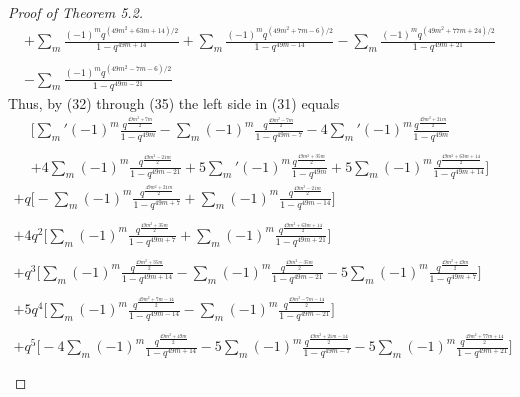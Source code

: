 \documentclass[10pt,reqno]{amsart}
\begin{document}
\begin{proof}[Proof of Theorem 5.2]
\begin{multline}
    +\displaystyle\sum_{m}\displaystyle\frac{(-1)^mq^{(49m^2+63m+14)/2}}{1-q^{49m+14}}+\displaystyle\sum_{m}\displaystyle\frac{(-1)^mq^{(49m^2+7m-6)/2}}{1-q^{49m-14}}-\displaystyle\sum_{m}\displaystyle\frac{(-1)^mq^{(49m^2+77m+24)/2}}{1-q^{49m+21}}\\ \\
    -\displaystyle\sum_{m}\displaystyle\frac{(-1)^mq^{(49m^2-7m-6)/2}}{1-q^{49m-21}}
\end{multline}
Thus, by (32) through (35) the left side in (31) equals 
\begin{multline*}
    \Bigg[\displaystyle\sum_{m}'(-1)^m\displaystyle\frac{q^{\frac{49m^2+7m}{2}}}{1-q^{49m}}-\displaystyle\sum_{m}(-1)^m\displaystyle\frac{q^{\frac{49m^2-7m}{2}}}{1-q^{49m-7}}-4\displaystyle\sum_{m}'(-1)^m\displaystyle\frac{q^{\frac{49m^2+21m}{2}}}{1-q^{49m}}\\ \\
    +4\displaystyle\sum_{m}(-1)^m\displaystyle\frac{q^{\frac{49m^2-21m}{2}}}{1-q^{49m-21}}+5\displaystyle\sum_{m}'(-1)^m\displaystyle\frac{q^{\frac{49m^2+35m}{2}}}{1-q^{49m}}+5\displaystyle\sum_{m}(-1)^m\displaystyle\frac{q^{\frac{49m^2+63m+14}{2}}}{1-q^{49m+14}}\Bigg] 
\end{multline*} 
\begin{multline}
    +q\Bigg[-\displaystyle\sum_{m}(-1)^m\displaystyle\frac{q^{\frac{49m^2+21m}{2}}}{1-q^{49m+7}}+\displaystyle\sum_{m}(-1)^m\displaystyle\frac{q^{\frac{49m^2-21m}{2}}}{1-q^{49m-14}}\Bigg] \\ \\
    +4q^2\Bigg[\displaystyle\sum_{m}(-1)^m\displaystyle\frac{q^{\frac{49m^2+35m}{2}}}{1-q^{49m+7}}+\displaystyle\sum_{m}(-1)^m\displaystyle\frac{q^{\frac{49m^2+63m+14}{2}}}{1-q^{49m+21}}\Bigg] \\ \\
    +q^3\Bigg[\displaystyle\sum_{m}(-1)^m\displaystyle\frac{q^{\frac{49m^2+35m}{2}}}{1-q^{49m+14}}-\displaystyle\sum_{m}(-1)^m\displaystyle\frac{q^{\frac{49m^2-35m}{2}}}{1-q^{49m-21}}-5\displaystyle\sum_{m}(-1)^m\displaystyle\frac{q^{\frac{49m^2+49m}{2}}}{1-q^{49m+7}}\Bigg] \\ \\
    +5q^4\bigg[\displaystyle\sum_{m}(-1)^m\displaystyle\frac{q^{\frac{49m^2+7m-14}{2}}}{1-q^{49m-14}}-\displaystyle\sum_{m}(-1)^m\displaystyle\frac{q^{\frac{49m^2-7m-14}{2}}}{1-q^{49m-21}}\Bigg] \\ \\
    +q^5\Bigg[-4\displaystyle\sum_{m}(-1)^m\displaystyle\frac{q^{\frac{49m^2+49m}{2}}}{1-q^{49m+14}}-5\displaystyle\sum_{m}(-1)^m\displaystyle\frac{q^{\frac{49m^2+21m-14}{2}}}{1-q^{49m-7}}-5\displaystyle\sum_{m}(-1)^m\displaystyle\frac{q^{\frac{49m^2+77m+14}{2}}}{1-q^{49m+21}}\Bigg] \\ \\

\end{multline}
\end{proof}
\end{document}
